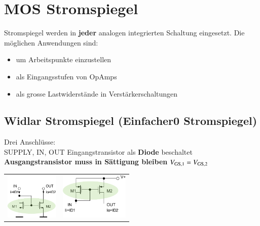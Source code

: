 \section{MOS Stromspiegel}

\begin{minipage}[t]{0.48\columnwidth}
    Stromspiegel werden in \textbf{jeder} analogen integrierten Schaltung eingesetzt.
    Die möglichen Anwendungen sind:
\end{minipage}
\hfill
\begin{minipage}[t]{0.48\columnwidth}
    \begin{itemize}
        \item um Arbeitspunkte einzustellen
        \item als Eingangsstufen von OpAmps
        \item als grosse Lastwiderstände in Verstärkerschaltungen
    \end{itemize}
\end{minipage}


\subsection{Widlar Stromspiegel (Einfacher0 Stromspiegel)}

\begin{minipage}[c]{0.35\columnwidth}
    \raggedright
    \begin{outline}
        \1 Drei Anschlüsse: \\
            SUPPLY, IN, OUT
        \1 Eingangstransistor als \textbf{Diode} beschaltet
        \1 \textbf{Ausgangstransistor muss in Sättigung bleiben}
        \1 $V_{\rm GS,1} = V_{\rm GS,2}$
    \end{outline}
\end{minipage}
\hfill
\begin{minipage}[c]{0.64\columnwidth}

     \begin{tabular}{c c@{}}
        \includegraphics[height=2.2cm]{images/06_stormspiegel_widlar_nKanal.pdf} & 
        \includegraphics[height=2.2cm]{images/06_stormspiegel_widlar_pKanal.pdf}
    \end{tabular}
    
\end{minipage}


